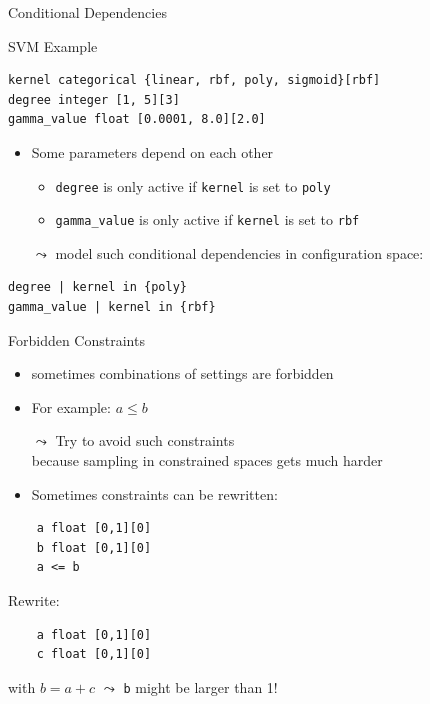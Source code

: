 \begin{frame}[c, fragile]{Conditional Dependencies}

\begin{block}{SVM Example}
\begin{verbatim}
kernel categorical {linear, rbf, poly, sigmoid}[rbf]
degree integer [1, 5][3]
gamma_value float [0.0001, 8.0][2.0]
\end{verbatim}
\end{block}

\begin{itemize}
  \item Some parameters depend on each other
  \begin{itemize}
    \item \texttt{degree} is only active if \texttt{kernel} is set to \texttt{poly}
    \item \texttt{gamma\_value} is only active if \texttt{kernel} is set to \texttt{rbf}  
  \end{itemize}
  \bigskip
  \pause
  \item[$\leadsto$] model such conditional dependencies in configuration space:
\end{itemize}

\begin{verbatim}
degree | kernel in {poly}
gamma_value | kernel in {rbf}
\end{verbatim}

\end{frame}
\begin{frame}[c, fragile]{Forbidden Constraints}

\begin{itemize}
  \item sometimes combinations of settings are forbidden
  \item For example: $a \leq b$
  \smallskip
  \pause
  \item[$\leadsto$] Try to avoid such constraints\\ because sampling in constrained spaces gets much harder
  \smallskip
  \item Sometimes constraints can be rewritten:
\end{itemize}

\begin{verbatim}
    a float [0,1][0]
    b float [0,1][0]
    a <= b
\end{verbatim}

Rewrite:
\begin{verbatim}
    a float [0,1][0]
    c float [0,1][0]
\end{verbatim}

with $b = a + c$ $\leadsto$ \texttt{b} might be larger than 1! 


\end{frame}

